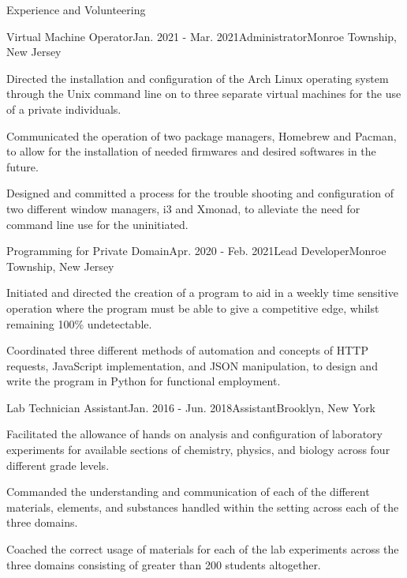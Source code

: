 \documentclass{resume}
\begin{document}
    \begin{rSection}{Experience and Volunteering}
        \begin{rSubsection}{Virtual Machine Operator}{Jan. 2021 - Mar. 2021}{Administrator}{Monroe Township, New Jersey}
            \item Directed the installation and configuration of the Arch Linux
                operating system through the Unix command line on to three
                separate virtual machines for the use of a private individuals.
            \item Communicated the operation of two package managers, Homebrew and
                Pacman, to allow for the installation of needed firmwares and
                desired softwares in the future.
            \item Designed and committed a process for the trouble shooting and
                configuration of two different window managers, i3 and Xmonad,
                to alleviate the need for command line use for the uninitiated.
        \end{rSubsection}
        \begin{rSubsection}{Programming for Private Domain}{Apr. 2020 - Feb. 2021}{Lead Developer}{Monroe Township, New Jersey}
            \item Initiated and directed the creation of a program to aid in a
                weekly time sensitive operation where the program must be able
                to give a competitive edge, whilst remaining 100\% undetectable.
            \item Coordinated three different methods of automation and concepts of HTTP
                requests, JavaScript implementation, and JSON manipulation, to
                design and write the program in Python for functional employment.
        \end{rSubsection}
        \begin{rSubsection}{Lab Technician Assistant}{Jan. 2016 - Jun. 2018}{Assistant}{Brooklyn, New York}
            \item Facilitated the allowance of hands on analysis and configuration
                of laboratory experiments for available sections of chemistry,
                physics, and biology across four different grade levels.
            \item Commanded the understanding and communication of each of the
                different materials, elements, and substances handled within the
                setting across each of the three domains.
            \item Coached the correct usage of materials for each of the lab
                experiments across the three domains consisting of greater than
                200 students altogether.
        \end{rSubsection}
    \end{rSection}
\end{document}
